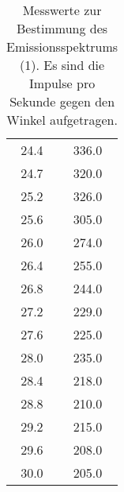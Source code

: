 \begin{table}[h]
\begin{tabular}{S S}
    24.4 & 336.0\\
    24.7 & 320.0\\
    25.2 & 326.0\\
    25.6 & 305.0\\
    26.0 & 274.0\\
    26.4 & 255.0\\
    26.8 & 244.0\\
    27.2 & 229.0\\
    27.6 & 225.0\\
    28.0 & 235.0\\
    28.4 & 218.0\\
    28.8 & 210.0\\
    29.2 & 215.0\\
    29.6 & 208.0\\
    30.0 & 205.0\\
    \bottomrule
  \end{tabular}
  \caption{Messwerte zur Bestimmung des Emissionsspektrums (1). Es sind die
  Impulse pro Sekunde gegen den Winkel aufgetragen.}
  \label{tab:emission1}
\end{table}


